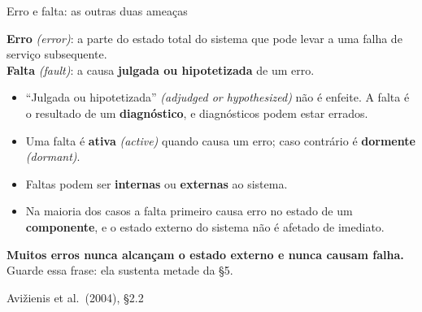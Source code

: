 \documentclass{beamer}
\newcommand{\en}[1]{{\color{depCinza}\textit{#1}}}
\newcommand{\sect}[1]{\par\smallskip\hfill{\tiny\color{black!55}Avi\v{z}ienis et al.\ (2004), #1}}
\begin{document}
\begin{frame}{Erro e falta: as outras duas amea\c{c}as}
    \footnotesize
    \begin{defi}
        \scriptsize
        \textbf{Erro} \en{(error)}: a parte do estado total do sistema que pode levar a uma falha de servi\c{c}o subsequente.\\[3pt]
        \textbf{Falta} \en{(fault)}: a causa \textbf{julgada ou hipotetizada} de um erro.
    \end{defi}
    \medskip
    \begin{itemize}
        \item ``Julgada ou hipotetizada'' \en{(adjudged or hypothesized)} n\~ao \'e enfeite. A falta \'e o resultado de um \textbf{diagn\'ostico}, e diagn\'osticos podem estar errados.
        \item Uma falta \'e \textbf{ativa} \en{(active)} quando causa um erro; caso contr\'ario \'e \textbf{dormente} \en{(dormant)}.
        \item Faltas podem ser \textbf{internas} ou \textbf{externas} ao sistema.
        \item Na maioria dos casos a falta primeiro causa erro no estado de um \textbf{componente}, e o estado externo do sistema n\~ao \'e afetado de imediato.
    \end{itemize}
    \medskip
    \begin{ancora}
        \footnotesize
        \textbf{Muitos erros nunca alcan\c{c}am o estado externo e nunca causam falha.} Guarde essa frase: ela sustenta metade da \S5.
    \end{ancora}
    \sect{\S2.2}
\end{frame}
\end{document}
